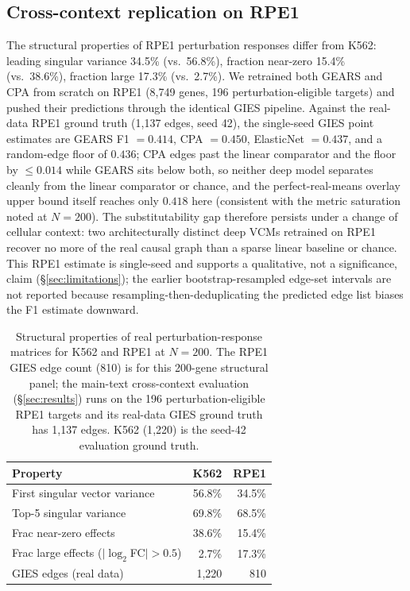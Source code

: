 \documentclass{article}
\theoremstyle{plain}
\theoremstyle{definition}
\theoremstyle{remark}
\begin{document}
\subsection{Cross-context replication on RPE1}
\label{app:rpe1}
The structural properties of RPE1 perturbation responses differ from K562: leading singular variance 34.5\% (vs.\ 56.8\%), fraction near-zero 15.4\% (vs.\ 38.6\%), fraction large 17.3\% (vs.\ 2.7\%). We retrained both GEARS and CPA from scratch on RPE1 (8{,}749 genes, 196 perturbation-eligible targets) and pushed their predictions through the identical GIES pipeline. Against the real-data RPE1 ground truth (1{,}137 edges, seed 42), the single-seed GIES point estimates are GEARS F1 $= 0.414$, CPA $= 0.450$, ElasticNet $= 0.437$, and a random-edge floor of $0.436$; CPA edges past the linear comparator and the floor by $\leq 0.014$ while GEARS sits below both, so neither deep model separates cleanly from the linear comparator or chance, and the perfect-real-means overlay upper bound itself reaches only $0.418$ here (consistent with the metric saturation noted at $N{=}200$). The substitutability gap therefore persists under a change of cellular context: two architecturally distinct deep VCMs retrained on RPE1 recover no more of the real causal graph than a sparse linear baseline or chance. This RPE1 estimate is single-seed and supports a qualitative, not a significance, claim (\S\ref{sec:limitations}); the earlier bootstrap-resampled edge-set intervals are not reported because resampling-then-deduplicating the predicted edge list biases the F1 estimate downward.

\begin{table}[h]
\centering
\small
\begin{tabular}{lrr}
\toprule
\textbf{Property} & \textbf{K562} & \textbf{RPE1} \\
\midrule
First singular vector variance     & 56.8\% & 34.5\% \\
Top-5 singular variance            & 69.8\% & 68.5\% \\
Frac near-zero effects             & 38.6\% & 15.4\% \\
Frac large effects ($|\log_2$FC$|>0.5$) & 2.7\%  & 17.3\% \\
GIES edges (real data)             & 1{,}220 & 810 \\
\bottomrule
\end{tabular}
\caption{Structural properties of real perturbation-response matrices for K562 and RPE1 at $N{=}200$. The RPE1 GIES edge count (810) is for this 200-gene structural panel; the main-text cross-context evaluation (\S\ref{sec:results}) runs on the 196 perturbation-eligible RPE1 targets and its real-data GIES ground truth has 1{,}137 edges. K562 (1{,}220) is the seed-42 evaluation ground truth.}
\end{table}
\end{document}

